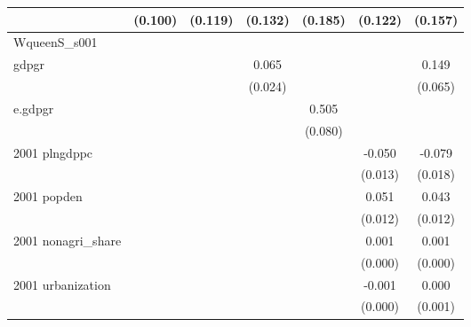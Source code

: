 \begin{table}[htbp]
\begin{tabular}{l*{6}{c}}
                    &     (0.100)         &     (0.119)         &     (0.132)         &     (0.185)         &     (0.122)         &     (0.157)         \\
\hline
WqueenS\_s001        &                     &                     &                     &                     &                     &                     \\
gdpgr               &                     &                     &       0.065\sym{***}&                     &                     &       0.149\sym{**} \\
                    &                     &                     &     (0.024)         &                     &                     &     (0.065)         \\
e.gdpgr             &                     &                     &                     &       0.505\sym{***}&                     &                     \\
                    &                     &                     &                     &     (0.080)         &                     &                     \\
2001 plngdppc       &                     &                     &                     &                     &      -0.050\sym{***}&      -0.079\sym{***}\\
                    &                     &                     &                     &                     &     (0.013)         &     (0.018)         \\
2001 popden         &                     &                     &                     &                     &       0.051\sym{***}&       0.043\sym{***}\\
                    &                     &                     &                     &                     &     (0.012)         &     (0.012)         \\
2001 nonagri\_share  &                     &                     &                     &                     &       0.001\sym{**} &       0.001\sym{**} \\
                    &                     &                     &                     &                     &     (0.000)         &     (0.000)         \\
2001 urbanization   &                     &                     &                     &                     &      -0.001         &       0.000         \\
                    &                     &                     &                     &                     &     (0.000)         &     (0.001)         \\

\end{tabular}
\end{table}
